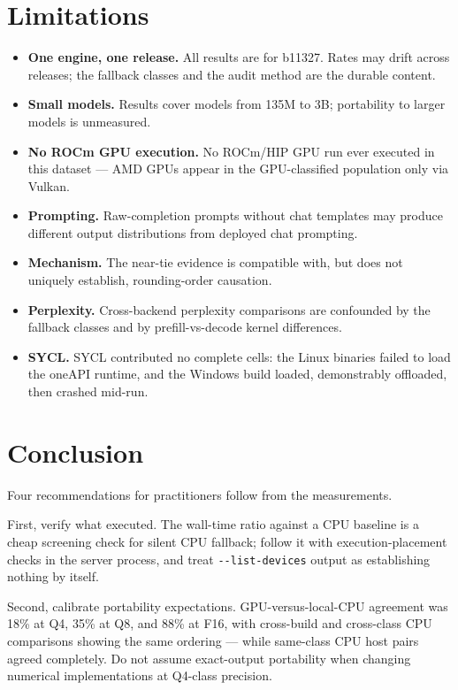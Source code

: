 \documentclass[11pt]{article}
\begin{document}
\section{Limitations}\label{sec:limitations}

\begin{itemize}
\item \textbf{One engine, one release.} All results are for b11327.
Rates may drift across releases; the fallback classes and the audit
method are the durable content.
\item \textbf{Small models.} Results cover models from 135M to 3B;
portability to larger models is unmeasured.
\item \textbf{No ROCm GPU execution.} No ROCm/HIP GPU run ever
executed in this dataset --- AMD GPUs appear in the GPU-classified
population only via Vulkan.
\item \textbf{Prompting.} Raw-completion prompts without chat
templates may produce different output distributions from deployed
chat prompting.
\item \textbf{Mechanism.} The near-tie evidence is compatible with,
but does not uniquely establish, rounding-order causation.
\item \textbf{Perplexity.} Cross-backend perplexity comparisons are
confounded by the fallback classes and by prefill-vs-decode kernel
differences.
\item \textbf{SYCL.} SYCL contributed no complete cells: the Linux
binaries failed to load the oneAPI runtime, and the Windows build
loaded, demonstrably offloaded, then crashed mid-run.
\end{itemize}

\section{Conclusion}\label{sec:conclusion}

Four recommendations for practitioners follow from the measurements.

First, verify what executed. The wall-time ratio against a CPU
baseline is a cheap screening check for silent CPU fallback; follow it
with execution-placement checks in the server process, and treat
\texttt{-{}-list-devices} output as establishing nothing by itself.

Second, calibrate portability expectations. GPU-versus-local-CPU
agreement was 18\% at Q4, 35\% at Q8, and 88\% at F16, with
cross-build and cross-class CPU comparisons showing the same ordering
--- while same-class CPU host pairs agreed completely. Do not assume
exact-output portability when changing numerical implementations at
Q4-class precision.
\end{document}
